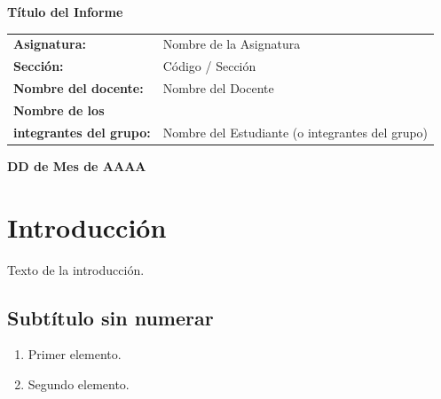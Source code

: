 \documentclass[11pt,a4paper]{article}
\newcommand{\docTitulo}{Título del Informe}
\newcommand{\docAsignatura}{Nombre de la Asignatura}
\newcommand{\docSeccion}{Código / Sección}
\newcommand{\docDocente}{Nombre del Docente}
\newcommand{\docEstudiante}{Nombre del Estudiante (o integrantes del grupo)}
\newcommand{\docFecha}{DD de Mes de AAAA}
\begin{document}
\vspace*{\fill}

\begin{center}
    {\huge\bfseries \docTitulo}
\end{center}

\vfill
\noindent
\begin{tabular}{@{}p{5.5cm} p{9cm}@{}}
  \textbf{Asignatura:}              & \docAsignatura \\[0.4em]
  \textbf{Sección:}                 & \docSeccion \\[0.4em]
  \textbf{Nombre del docente:}      & \docDocente \\[0.4em]
  \textbf{Nombre de los}            & \\
  \textbf{integrantes del grupo:}   &
    {\color{inacapRed} \docEstudiante}   \\[0.15em]
\end{tabular}

\vspace{1.5cm}

\begin{center}
  \textbf{\docFecha}
\end{center}

\clearpage
\restoregeometry
\pagestyle{mainpage}

\vspace{1cm}

\tableofcontents
\newpage

\section*{Introducción}
Texto de la introducción.

\subsection*{Subtítulo sin numerar}
\begin{enumerate}[label=\alph*)]
    \item Primer elemento.
    \item Segundo elemento.
\end{enumerate}

\newpage
\end{document}
